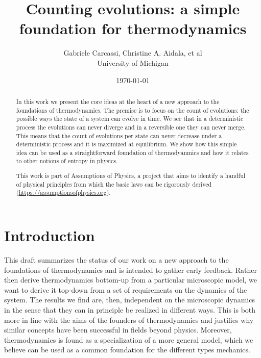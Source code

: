 \documentclass[letterpaper,twocolumn]{article}
\begin{document}
\title{Counting evolutions: a simple foundation for thermodynamics}
\author{Gabriele Carcassi, Christine A. Aidala, et al \\ University of Michigan}

\date{\today}

\maketitle

\begin{abstract}
	In this work we present the core ideas at the heart of a new approach to the foundations of thermodynamics. The premise is to focus on the count of evolutions: the possible ways the state of a system can evolve in time. We see that in a deterministic process the evolutions can never diverge and in a reversible one they can never merge. This means that the count of evolutions per state can never decrease under a deterministic process and it is maximized at equilibrium. We show how this simple idea can be used as a straightforward foundation of thermodyanmics and how it relates to other notions of entropy in physics.
	
	This work is part of Assumptions of Physics, a project that aims to identify a handful of physical principles from which the basic laws can be rigorously derived  (\url{https://assumptionsofphysics.org}).
\end{abstract}


\section{Introduction}

This draft summarizes the status of our work on a new approach to the foundations of thermodynamics and is intended to gather early feedback. Rather then derive thermodynamics bottom-up from a particular microscopic model, we want to derive it top-down from a set of requirements on the dynamics of the system. The results we find are, then, independent on the microscopic dynamics in the sense that they can in principle be realized in different ways. This is both more in line with the aims of the founders of thermodynamics and justifies why similar concepts have been successful in fields beyond physics. Moreover, thermodynamics is found as a specialization of a more general model, which we believe can be used as a common foundation for the different types mechanics.
\end{document}
